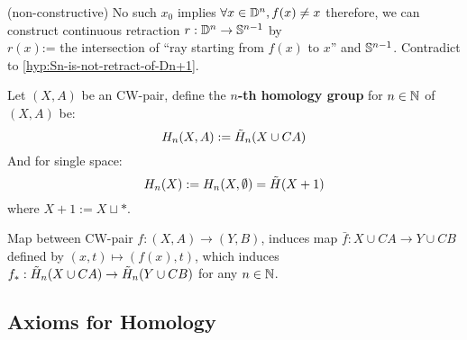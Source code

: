     \begin{prf}
        (non-constructive)
        No such $x_0$ implies $\forall x \in \mathbb D^n , f(x) \neq x$
        therefore, we can construct continuous retraction $r : \mathbb D^n \to \mathbb S^{n-1}$
        by\\ $r(x)$:= the intersection of ``ray starting from $f(x)$ to $x$'' and $\mathbb S^{n-1}$.
        Contradict to \ref{hyp:Sn-is-not-retract-of-Dn+1}.
    \end{prf}

    \begin{defn}
        \label{hyp:homology-group-defined-using-SP}
        Let $(X,A)$ be an CW-pair, define the
        \textbf{$n$-th homology group} for $n \in \mathbb N$ of $(X,A)$ be:\\
        $$
        H_n(X,A)  :=  \tilde{H}_n(X \cup CA)
        $$
        And for single space:\\
        $$
        H_n(X) := H_n(X, \emptyset) = \tilde{H}(X + 1)
        $$
        where $X + 1 := X \sqcup *$.
    \end{defn}

    \begin{note}
        Map between CW-pair $f : (X,A) \to (Y,B)$,
        induces map $\bar{f} : X \cup CA \to Y \cup CB$
        defined by $(x,t) \mapsto (f(x),t)$,
        which induces $f_* : \tilde{H}_n(X \cup CA) \to \tilde{H}_n(Y \cup CB)$ for any $n \in \mathbb N$.
    \end{note}

    \subsection{Axioms for Homology}

